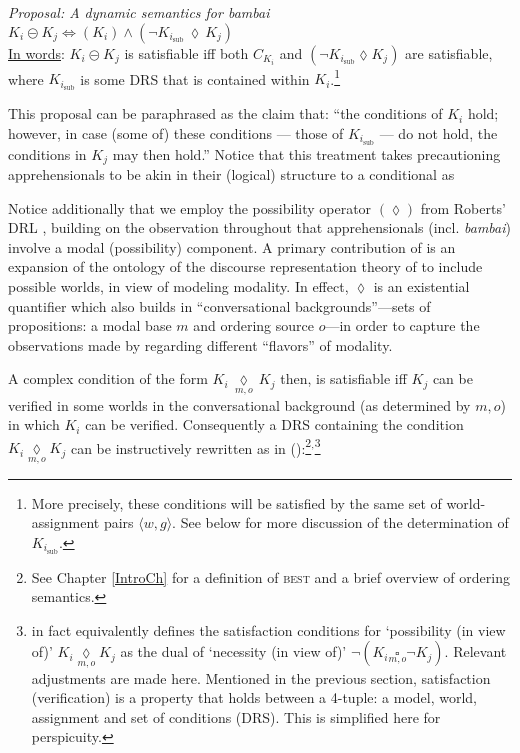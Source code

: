 \ex \label{bb-complex} \textit{Proposal: A dynamic semantics for \emph{bambai}}\\
$ K_i\circleddash K_j\iff (K_i) \wedge (\neg K_{i_{\text{sub}}}\,\lozenge\,K_j) $\nobreak\\
\uline{In words}: $ K_{i}\circleddash K_j$ is satisfiable iff both $ C_{K_i} $ and $ (\neg K_{i_{\text{sub}}}\lozenge K_j)$ are satisfiable, where $K_{i_{\text{sub}}}$ is some DRS that is contained within $K_{i}$.\footnote{More precisely, these  conditions will be satisfied by the same set of world-assignment pairs $ \langle w,g\rangle $. See below for more discussion of the determination of $K_{i_{\text{sub}}} $.\label{caveat-type}}\xe

\noindent This proposal can be paraphrased as the claim that: ``the conditions of $K_i$ hold; however, in case (some of) these conditions --- those of $K_{i_{\text{sub}}}$ --- do not hold, the conditions in $K_j$ may then hold.'' Notice that this treatment takes precautioning apprehensionals to be akin in their (logical) structure to a conditional as 

Notice additionally that we employ the possibility operator $ (\lozenge) $ from Roberts' DRL \citeyearpar[695, 715]{Roberts1989}, building on the observation throughout that apprehensionals (incl. \textit{bambai}) involve a modal (possibility) component. A primary contribution of \citealt{Roberts1989} is an expansion of the ontology of the discourse representation theory of \citealt{Kamp1981} to include possible worlds, in view of modeling modality. In effect, $ \lozenge$ is an existential quantifier which also builds in ``conversational backgrounds''---sets of propositions: a modal base $ m $ and ordering source $ o $---in order to capture the observations made by \citet[\S2.7]{Kratzer1981} regarding different ``flavors'' of modality. 

A complex condition of the form $K_i\,\underset{m,o}{\lozenge}\,K_j$  then, is satisfiable iff $ K_j $ can be verified in some worlds in the conversational background (as determined by $ m,o $) in which $ K_i $ can be verified. Consequently a DRS containing the condition $ K_i\underset{m,o}{\lozenge}K_j $ can be instructively rewritten as in (\nextx):\footnote{See Chapter \ref{IntroCh} for a definition of \textsc{best} and a brief overview of ordering semantics.}$ ^, $\footnote{\citet{Roberts1989} in fact equivalently defines the satisfaction conditions for `possibility (in view of)' $ K_i\underset{m,o}{\lozenge}K_j$ as the dual of `necessity (in view of)' $ \neg(K_i\underset{m,o}{\square}\neg K_j)$. Relevant adjustments are made here. Mentioned in the previous section, satisfaction (verification) is a property that holds between a 4-tuple: a model, world, assignment and set of conditions (DRS). This is simplified here for perspicuity.}

